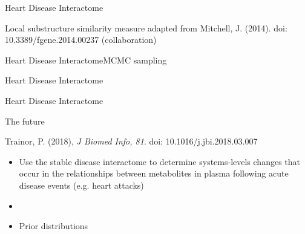 \documentclass[xcolor=dvipsnames]{beamer}
\begin{document}
\begin{frame}{Heart Disease Interactome}
		\vspace{-15.5pt}
	\begin{center}
		
		Local substructure similarity measure adapted from Mitchell, J. (2014). doi: 10.3389/fgene.2014.00237 (collaboration)
	\end{center}
\end{frame}

\begin{frame}{Heart Disease Interactome}{MCMC sampling}
	\vspace{-10.5pt}
	\begin{center}
	\end{center}
\end{frame}

\begin{frame}{Heart Disease Interactome}
	\vspace{-10.5pt}
	\begin{center}
	\end{center}
\end{frame}

\begin{frame}{Heart Disease Interactome}
	\vspace{-10.5pt}
	\begin{center}
	\end{center}
\end{frame}

\begin{frame}{The future}
	\vspace{-15pt}
	\begin{center}
		
		Trainor, P. (2018), \emph{J Biomed Info, 81}. doi: 10.1016/j.jbi.2018.03.007 
	\end{center}
	\begin{itemize}
		\item Use the stable disease interactome to determine systems-levels changes that occur in the relationships between metabolites in plasma following acute disease events (e.g. heart attacks)
		\item[]
		\item Prior distributions 
	\end{itemize}
\end{frame}
\end{document}
